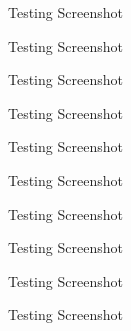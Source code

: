 \documentclass[a4paper, 11pt]{article}
\begin{document}
\begin{appendix}
\begin{multicols}{2}
\begin{figure}[H]
\centering
\caption{Testing Screenshot}
\label{CreatorScreenshot10}
\end{figure}

\begin{figure}[H]
\centering
\caption{Testing Screenshot}
\label{CreatorScreenshot11}
\end{figure}

\begin{figure}[H]
\centering
\caption{Testing Screenshot}
\label{CreatorScreenshot12}
\end{figure}

\begin{figure}[H]
\centering
\caption{Testing Screenshot}
\label{CreatorScreenshot13}
\end{figure}

\begin{figure}[H]
\centering
\caption{Testing Screenshot}
\label{CreatorScreenshot14}
\end{figure}

\begin{figure}[H]
\centering
\caption{Testing Screenshot}
\label{CreatorScreenshot15}
\end{figure}

\begin{figure}[H]
\centering
\caption{Testing Screenshot}
\label{CreatorScreenshot16}
\end{figure}

\begin{figure}[H]
\centering
\caption{Testing Screenshot}
\label{CreatorScreenshot17}
\end{figure}

\begin{figure}[H]
\centering
\caption{Testing Screenshot}
\label{CreatorScreenshot18}
\end{figure}

\begin{figure}[H]
\centering
\caption{Testing Screenshot}
\label{RunnerScreenshot1}
\end{figure}


\end{multicols}
\end{appendix}
\end{document}
